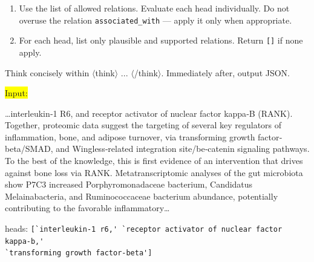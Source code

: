 \documentclass[10pt]{article}
\begin{document}
\begin{appendices}
\begin{tcolorbox}
\begin{enumerate}
  \item Use the list of allowed relations.  
    Evaluate each head individually. Do not overuse the relation \texttt{associated\_with} — apply it only when appropriate.  

  \item For each head, list only plausible and supported relations.
    Return \verb|[]| if none apply.  
\end{enumerate}

\vspace{\baselineskip}

Think concisely within $\langle$think$\rangle$ ... $\langle$/think$\rangle$.  
Immediately after, output JSON.  

\end{tcolorbox}



\begin{tcolorbox}[
    title=Few-shot Example for the Relation Matching Prompt,
    halign title=center,
    colback=white,        %
    colframe=blue,        %
    breakable,
    boxrule=0.8pt,        %
    arc=4mm,              %
    left=4pt,             %
    right=4pt,            %
    top=4pt,              %
    bottom=4pt,           %
    fontupper=\small
]

\colorbox{Yellow}{Input:}
\begin{mdframed}[backgroundcolor=Yellow!20,skipabove=1em,skipbelow=1em,]
\dots interleukin‐1 R6, and receptor activator of nuclear factor kappa‐B (RANK). Together, proteomic data suggest the targeting of several key regulators of inflammation, bone, and adipose turnover, via transforming growth factor‐beta/SMAD, and Wingless‐related integration site/be‐catenin signaling pathways. To the best of the knowledge, this is first evidence of an intervention that drives against bone loss via RANK. Metatranscriptomic analyses of the gut microbiota show P7C3 increased Porphyromonadaceae bacterium, Candidatus Melainabacteria, and Ruminococcaceae bacterium abundance, potentially contributing to the favorable inflammatory\dots
\end{mdframed}

heads: \verb|[`interleukin-1 r6,' `receptor activator of nuclear factor kappa-b,'|\\
\verb|`transforming growth factor‐beta']|

\vspace{\baselineskip}


\end{tcolorbox}
\end{appendices}
\end{document}
